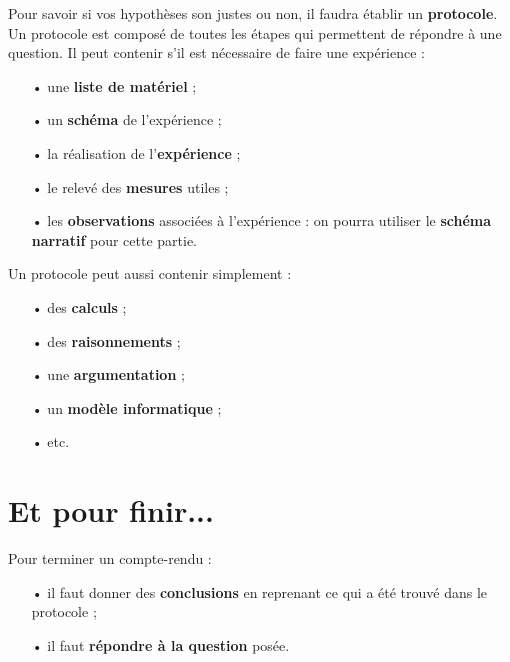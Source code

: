 Pour savoir si vos hypothèses son justes ou non, il  faudra établir un \textbf{protocole}. Un protocole est composé de toutes les étapes qui permettent de répondre à une question. Il peut contenir s'il est nécessaire de faire une expérience :
\begin{itemize}
\item[•] une \textbf{liste de matériel} ;
\item[•] un \textbf{schéma} de l'expérience ;
\item[•] la réalisation de l'\textbf{expérience} ;
\item[•] le relevé des \textbf{mesures} utiles ;
\item[•] les \textbf{observations} associées à l'expérience : on pourra utiliser le \textbf{schéma narratif} pour cette partie.
\end{itemize}
Un protocole peut aussi contenir simplement :
\begin{itemize}
\item[•] des \textbf{calculs} ;
\item[•] des \textbf{raisonnements} ;
\item[•] une \textbf{argumentation} ;
\item[•] un \textbf{modèle informatique} ;
\item[•] etc.
\end{itemize}

\section*{Et pour finir...}

Pour terminer un compte-rendu :
\begin{itemize}
\item[•] il faut donner des \textbf{conclusions} en reprenant ce qui a été trouvé dans le protocole ;
\item[•] il faut \textbf{répondre à la question} posée.
\end{itemize}

